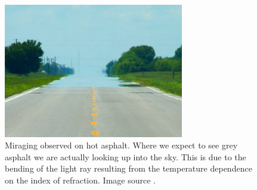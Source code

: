 \documentclass[12pt,twoside]{article}
\begin{document}
\begin{figure}
  \centering
  \includegraphics[width=0.7\textwidth]{../figures/picture.jpg}
  \caption{Miraging observed on hot asphalt. Where we expect to see grey asphalt we are actually looking up into the sky. This is due to the bending of the light ray resulting from the temperature dependence on the index of refraction. Image source \cite{sixty_symbols}.}
  \label{fig:2d2}
\end{figure}
\newpage


\end{document}
